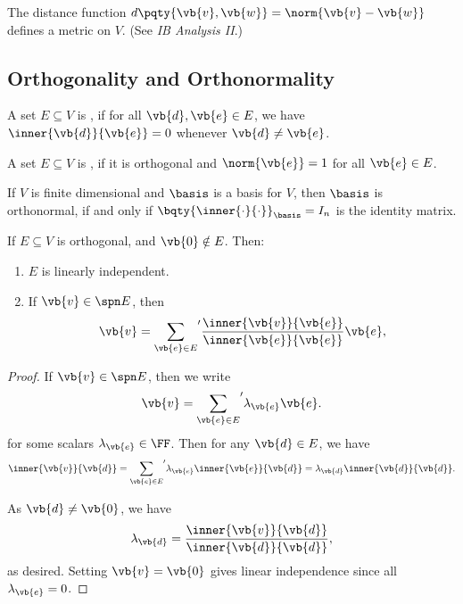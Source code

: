 \begin{remark}
    The distance function \(d\pqty{\vb{v}, \vb{w}} = \norm{\vb{v} - \vb{w}}\) defines a metric on \(V\). (See \textit{IB Analysis II}.)
\end{remark}

\subsection{Orthogonality and Orthonormality}

\begin{definition}
    A set \(E \subseteq V\) is , if for all \(\vb{d}, \vb{e} \in E\), we have \(\inner{\vb{d}}{\vb{e}} = 0\) whenever \(\vb{d} \neq \vb{e}\).

    A set \(E \subseteq V\) is , if it is orthogonal and \(\norm{\vb{e}} = 1\) for all \(\vb{e} \in E\).
\end{definition}

\begin{remark}
    If \(V\) is finite dimensional and \(\basis\) is a basis for \(V\), then \(\basis\) is orthonormal, if and only if \(\bqty{\inner{\cdot}{\cdot}}_{\basis} = I_n\) is the identity matrix.
\end{remark}

\begin{lemma}
    \label{lem:decomposition-of-a-vector-in-an-orthogonal-set}%
    If \(E \subseteq V\) is orthogonal, and \(\vb{0} \notin E\). Then:
    \begin{enumerate}[label=(\roman*)]
        \item \(E\) is linearly independent.
        \item If \(\vb{v} \in \spn E\), then
        \[
            \vb{v} = {\sum_{\vb{e} \in E}}' \frac{\inner{\vb{v}}{\vb{e}}}{\inner{\vb{e}}{\vb{e}}} \vb{e},
        \]
    \end{enumerate}
\end{lemma}

\begin{proof}
    If \(\vb{v} \in \spn E\), then we write
    \[
        \vb{v} = {\sum_{\vb{e} \in E}}' \lambda_{\vb{e}} \vb{e}.
    \]
    for some scalars \(\lambda_{\vb{e}} \in \FF\). Then for any \(\vb{d} \in E\), we have
    \[
        \inner{\vb{v}}{\vb{d}} = {\sum_{\vb{e} \in E}}' \lambda_{\vb{e}} \inner{\vb{e}}{\vb{d}} = \lambda_{\vb{d}} \inner{\vb{d}}{\vb{d}}.
    \]

    As \(\vb{d} \neq \vb{0}\), we have
    \[
        \lambda_{\vb{d}} = \frac{\inner{\vb{v}}{\vb{d}}}{\inner{\vb{d}}{\vb{d}}},
    \]
    as desired. Setting \(\vb{v} = \vb{0}\) gives linear independence since all \(\lambda_{\vb{e}} = 0\).
\end{proof}

